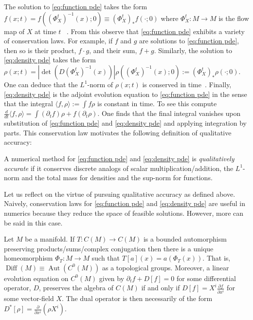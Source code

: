 \documentclass[final,leqno]{siamart}
\newcommand{\pder}[2]{\ensuremath{\frac{ \partial #1}{\partial #2}}}
\DeclareMathOperator{\Diff}{Diff}
\begin{document}
The solution to \eqref{eq:function pde} takes the form $f(x;t) = f( (\Phi_{X}^{t})^{-1}(x) ; 0) \equiv (\Phi_{X}^{t})_{*} f(\cdot;0)$
where $\Phi_{X}^{t}:M \to M$ is the flow map of $X$ at time $t$ ~\cite[Chapter 18]{Lee2006}.
From this observe that \eqref{eq:function pde} exhibits a variety of conservation laws.
For example, if $f$ and $g$ are solutions to \eqref{eq:function pde},
then so is their product, $f \cdot g$, and their sum, $f+g$.
Similarly, the solution to \eqref{eq:density pde} takes the form $\rho(x;t) = | \det( D(\Phi_{X}^{t})^{-1}(x) ) | \rho( (\Phi_{X}^{t})^{-1}(x) ;0) := (\Phi_{X}^{t})_{*} \rho(\cdot;0)$.
One can deduce that the $L^{1}$-norm of $\rho(x;t)$ is conserved in time~\cite[Theorem 16.42]{Lee2006}.
Finally, \eqref{eq:density pde} is the adjoint evolution equation to \eqref{eq:function pde} in the sense that the integral $\langle f , \rho \rangle := \int f \rho$ is constant in time. To see this compute
$\frac{d}{dt} \langle f , \rho \rangle = \int ( \partial_{t} f ) \rho + f ( \partial_{t} \rho) $.  One finds that the final integral vanishes upon substitution of \eqref{eq:function pde} and \eqref{eq:density pde} and applying integration by parts.
This conservation law motivates the following definition of qualitative accuracy:

\begin{definition} \label{def:quality}
	    A numerical method for \eqref{eq:function pde} and \eqref{eq:density pde} is \emph{qualitatively accurate} if it conserves discrete analogs of scalar multiplication/addition, the $L^{1}$-norm and the total mass for densities and the sup-norm for functions.
\end{definition}

Let us reflect on the virtue of pursuing qualitative accuracy as defined above.
Naively, conservation laws for \eqref{eq:function pde} and \eqref{eq:density pde} are useful in numerics because they reduce the space of feasible solutions.
However, more can be said in this case.

\begin{proposition}
	Let $M$ be a manifold.
	If $T: C(M) \to C(M)$ is a bounded automorphism preserving products/sums/complex conjugation
	then there is a unique homeomorphism $\Phi_{T}:M \to M$ such that $T[a](x) = a( \Phi_{T}(x) )$.
	That is, $\Diff(M) \equiv \operatorname{Aut}( C^{0}(M) )$ as a topological groups.
	Moreover, a linear evolution equation on $C^{0}(M)$ given by $\partial_{t} f + D[f] = 0$ for some differential operator, $D$,
	preserves  the algebra of $C(M)$ if and only if $D[f] = X^{i} \pder{f}{x^{i}}$ for some vector-field $X$.
	The dual operator is then necessarily of the form $D^{*}[\rho] = \pder{}{x^{i}}( \rho X^{i})$.
\end{proposition}
\end{document}
